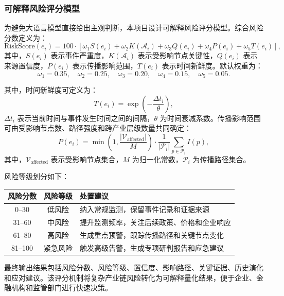 ﻿\documentclass[12pt,a4paper]{article}
\begin{document}
\subsubsection{可解释风险评分模型}

为避免大语言模型直接给出主观判断，本项目设计可解释风险评分模型。综合风险分数定义为：
\begin{equation}
\text{RiskScore}(e_i)=100 \cdot
\left[
\omega_1 S(e_i)
+
\omega_2 K(\mathcal{A}_i)
+
\omega_3 Q(e_i)
+
\omega_4 P(e_i)
+
\omega_5 T(e_i)
\right],
\end{equation}
其中，$S(e_i)$ 表示事件严重度，$K(\mathcal{A}_i)$ 表示受影响节点关键性，$Q(e_i)$ 表示来源置信度，$P(e_i)$ 表示传播影响范围，$T(e_i)$ 表示时间新鲜度。默认权重为：
\begin{equation}
\omega_1=0.35,\quad
\omega_2=0.25,\quad
\omega_3=0.20,\quad
\omega_4=0.15,\quad
\omega_5=0.05.
\end{equation}

其中，时间新鲜度可定义为：
\begin{equation}
T(e_i)=\exp\left(-\frac{\Delta t_i}{\theta}\right),
\end{equation}
$\Delta t_i$ 表示当前时间与事件发生时间之间的间隔，$\theta$ 为时间衰减系数。传播影响范围可由受影响节点数、路径强度和跨产业层级数量共同确定：
\begin{equation}
P(e_i)=
\min\left(
1,
\frac{|\mathcal{V}_{\text{affected}}|}{M}
\right)
\cdot
\frac{1}{|\mathcal{P}_i|}
\sum_{p \in \mathcal{P}_i} I(p),
\end{equation}
其中，$\mathcal{V}_{\text{affected}}$ 表示受影响节点集合，$M$ 为归一化常数，$\mathcal{P}_i$ 为传播路径集合。

风险等级划分如下：
\begin{center}
\begin{tabularx}{0.9\linewidth}{c c >{\raggedright\arraybackslash}X}
\toprule
风险分数 & 风险等级 & 处置建议 \\
\midrule
0--30 & 低风险 & 纳入常规监测，保留事件记录和证据来源 \\
31--60 & 中风险 & 提升监测频率，关注后续政策、价格和企业响应 \\
61--80 & 高风险 & 生成重点预警，跟踪传播路径和关键节点变化 \\
81--100 & 紧急风险 & 触发高级告警，生成专项研判报告和应急建议 \\
\bottomrule
\end{tabularx}
\end{center}

最终输出结果包括风险分数、风险等级、置信度、影响路径、关键证据、历史演化和应对建议。该评分机制将复杂产业链风险转化为可解释量化结果，便于企业、金融机构和监管部门进行快速决策。
\end{document}
